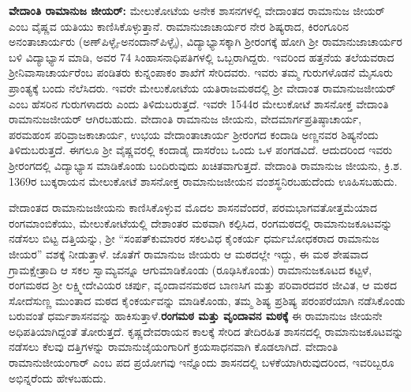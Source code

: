 \textbf{ವೇದಾಂತಿ ರಾಮಾನುಜ ಜೀಯರ್​:} ಮೇಲುಕೋಟೆಯ ಅನೇಕ ಶಾಸನಗಳಲ್ಲಿ ವೇದಾಂತದ ರಾಮಾನುಜ ಜೀಯರ್​ ಎಂಬ ವೈಷ್ಣವ ಯತಿಯು ಕಾಣಿಸಿಕೊಳ್ಳುತ್ತಾನೆ. ರಾಮಾನುಜಾಚಾರ್ಯರ ನೇರ ಶಿಷ್ಯರಾದ, ಕಿರಂಗೂರಿನ ಅನಂತಾಚಾರ್ಯರು (ಅಣ್​ಪಿಳ್ಳೈ-ಅನಂದಾನ್​ಪಿಳ್ಳೈ), ವಿದ್ಯಾಭ್ಯಾಸಕ್ಕಾಗಿ ಶ‍್ರೀರಂಗಕ್ಕೆ ಹೋಗಿ ಶ‍್ರೀ ರಾಮಾನುಜಾಚಾರ್ಯರ ಬಳಿ ವಿದ್ಯಾಭ್ಯಾಸ ಮಾಡಿ, ಅವರ 74 ಸಿಂಹಾಸನಾಧಿಪತಿಗಳಲ್ಲಿ ಒಬ್ಬರಾಗಿದ್ದರು. ಇವರಿಂದ ಹತ್ತನೆಯ ತಲೆಯವರಾದ ಶ‍್ರೀನಿವಾಸಾಚಾರ್ಯರೆಂಬ ಪಂಡಿತರು ಕುನ್ನಂಪಾಕಂ ಶಾಖೆಗೆ ಸೇರಿದವರು. ಇವರು ತಮ್ಮ ಗುರುಗಳೊಡನೆ ಮೈಸೂರು ಪ್ರಾಂತ್ಯಕ್ಕೆ ಬಂದು ನೆಲೆಸಿದರು. ಇವರೇ ಮೇಲುಕೋಟೆಯ ಯತಿರಾಜಮಠದಲ್ಲಿ ಶ‍್ರೀ ವೇದಾಂತ ರಾಮಾನುಜಜೀಯರ್​ ಎಂಬ ಹೆಸರಿನ ಗುರುಗಳಾದರು ಎಂದು ತಿಳಿದುಬರುತ್ತದೆ. ಇವರೇ 1544ರ ಮೇಲುಕೋಟೆ ಶಾಸನೋಕ್ತ ವೇದಾಂತಿ ರಾಮಾನುಜಜೀಯರ್​ ಆಗಿರಬಹುದು. ವೇದಾಂತಿ ರಾಮಾನುಜ ಜೀಯನು, ವೇದಮಾರ್ಗಪ್ರತಿಷ್ಠಾಚಾರ್ಯ, ಪರಮಹಂಸ ಪರಿವ್ರಾಜಕಾಚಾರ್ಯ, ಉಭಯ ವೇದಾಂತಾಚಾರ್ಯ ಶ‍್ರೀರಂಗದ ಕಂದಾಡಿ ಅಣ್ಣನವರ ಶಿಷ್ಯನೆಂದು ತಿಳಿದುಬರುತ್ತದೆ. ಈಗಲೂ ಶ‍್ರೀ ವೈಷ್ಣವರಲ್ಲಿ ಕಂದಾಡೈ ದಾಸರೆಂಬ ಒಂದು ಒಳ ಪಂಗಡವಿದೆ. ಆದುದರಿಂದ ಇವರು ಶ‍್ರೀರಂಗದಲ್ಲಿ ವಿದ್ಯಾಭ್ಯಾಸ ಮಾಡಿಕೊಂಡು ಬಂದಿರುವುದು ಖಚಿತವಾಗುತ್ತದೆ. ವೇದಾಂತಿ ರಾಮಾನುಜ ಜೀಯನು, ಕ್ರಿ.ಶ. 1369ರ ಬುಕ್ಕರಾಯನ ಮೇಲುಕೋಟೆ ಶಾಸನೋಕ್ತ ರಾಮಾನುಜಜೀಯನ ವಂಶಸ್ಥನಿರಬಹುದೆಂದು ಊಹಿಸಬಹುದು.

ವೇದಾಂತದ ರಾಮಾನುಜಜೀಯನು ಕಾಣಿಸಿಕೊಳ್ಳುವ ಮೊದಲ ಶಾಸನವೆಂದರೆ, ಪರಮಭಾಗವತೋತ್ತಮೆಯಾದ ರಂಗಮಾಂಬಿಕೆಯು, ಮೇಲುಕೋಟೆಯಲ್ಲಿ ದೇಶಾಂತರ ಮಠವಾಗಿ ಕಲ್ಪಿಸಿದ, ರಂಗಮಠದಲ್ಲಿ ರಾಮಾನುಜಕೂಟವನ್ನು ನಡೆಸಲು ಬಿಟ್ಟ ದತ್ತಿಯನ್ನು, ಶ‍್ರೀ “ಸಂಪತ್​ಕುಮಾರರ ಸಕಲವಿಧ ಕೈಂಕರ್ಯ ಧರ್ಮಬೋಧಕರಾದ ರಾಮಾನುಜ ಜೀಯರ” ವಶಕ್ಕೆ ನೀಡುತ್ತಾಳೆ. ಜೊತೆಗೆ ರಾಮಾನುಜ ಜೀಯರು ಆ ಮಠದಲ್ಲೇ ಇದ್ದು, ಈ ಮಠ ಶೇಷವಾದ ಗ್ರಾಮಕ್ಷೇತ್ರಾದಿ ಆ ಸಕಲ ಸ್ವಾಮ್ಯವನ್ನೂ ಆಗುಮಾಡಿಕೊಂಡು (ರೂಢಿಸಿಕೊಂಡು) ರಾಮಾನುಜಕೂಟದ ಕಟ್ಟಳೆ, ರಂಗಮಠದ ಶ‍್ರೀ ಲಕ್ಷ್ಮೀದೇವಿಯರ ಚರ್ಪು, ವೃಂದಾವನಮಠದ ಬಾಣಸಿಗ ಮತ್ತು ಪರಿವಾರದವರ ಜೀವಿತ, ಆ ಮಠದ ಸೋದೆಸುಣ್ಣ ಮುಂತಾದ ಮಠದ ಕೈಂಕರ್ಯವನ್ನು ಮಾಡಿಕೊಂಡು, ತಮ್ಮ ಶಿಷ್ಯ ಪ್ರಶಿಷ್ಯ ಪರಂಪರೆಯಾಗಿ ನಡೆಸಿಕೊಂಡು ಬರುವಂತೆ ಧರ್ಮಶಾಸನವನ್ನು ಹಾಕಿಸುತ್ತಾಳೆ.\textbf{ರಂಗಮಠ ಮತ್ತು ವೃಂದಾವನ ಮಠಕ್ಕೆ} ಈ ರಾಮಾನುಜ ಜೀಯನೇ ಅಧಿಪತಿಯಾಗಿದ್ದಂತೆ ತೋರುತ್ತದೆ. ಕೃಷ್ಣದೇವರಾಯನ ಕಾಲಕ್ಕೆ ಸೇರಿದ ತೇದಿರಹಿತ ಶಾಸನದಲ್ಲಿ ರಾಮಾನುಜಕೂಟವನ್ನು ನಡೆಸಲು ಕೆಲವು ದತ್ತಿಗಳನ್ನು ರಾಮಾನುಜೈಯಂಗಾರಿಗೆ ಕ್ರಯಸಾಧನವಾಗಿ ಕೊಡಲಾಗಿದೆ. ವೇದಾಂತಿ ರಾಮಾನುಜೀಯಂಗಾರ್​ ಎಂಬ ಪದ ಪ್ರಯೋಗವು ಇನ್ನೊಂದು ಶಾಸನದಲ್ಲಿ ಬಳಕೆಯಾಗಿರುವುದರಿಂದ, ಇವರಿಬ್ಬರೂ ಅಭಿನ್ನರೆಂದು ಹೇಳಬಹುದು.

